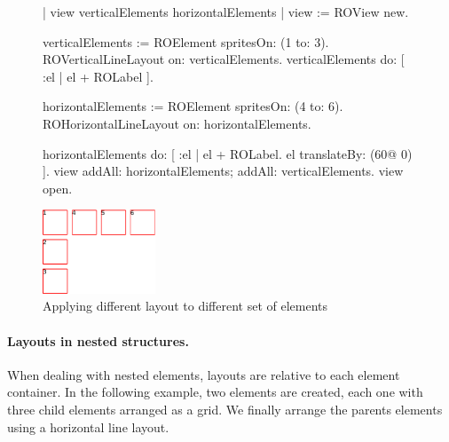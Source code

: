 \documentclass[a4paper,10pt,twoside]{book}
\begin{document}
\begin{figure}[H]
\label{fig:differentLayouts}
\vspace{0pt}
	\begin{minipage}[t]{1\textwidth}
     \begin{code}{}
| view verticalElements horizontalElements |
view := ROView new.

verticalElements := ROElement spritesOn: (1 to: 3).
ROVerticalLineLayout on: verticalElements.
verticalElements do: [ :el | el + ROLabel ].
	
horizontalElements := ROElement spritesOn: (4 to: 6).
ROHorizontalLineLayout on: horizontalElements.
	
horizontalElements do: [ :el |
	el + ROLabel.
	el translateBy: (60@ 0) ].	
view 
	addAll: horizontalElements; 
	addAll: verticalElements.
view open.
  \end{code}
   \end{minipage}  

\hfill
   \begin{minipage}[t]{1\textwidth}
      \vspace{0pt} \raggedright
       \centering
		\includegraphics[width=0.3\textwidth]{differentLayouts} 
   \end{minipage}
\caption{Applying different layout to different set of elements}
\end{figure} 



\paragraph{Layouts in nested structures.}
When dealing with nested elements, layouts are relative to each element container. In the following example, two elements are created, each one with three child elements arranged as a grid. We finally arrange the parents elements using a horizontal line layout.
\end{document}
